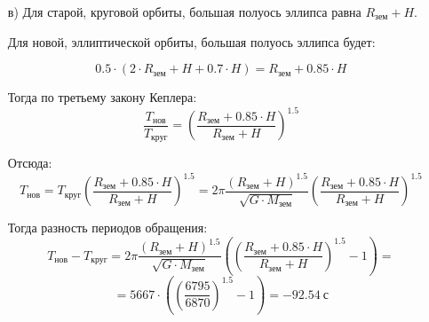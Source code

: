 \begin{enumerate}
    \item[в)] Для старой, круговой орбиты, большая полуось эллипса равна $R_\text{зем} + H$. 
    
    Для новой, эллиптической орбиты, большая полуось эллипса будет: 
    
    $$0.5 \cdot (2 \cdot R_\text{зем}+H+0.7 \cdot H)=R_\text{зем}+0.85 \cdot H$$
    
    Тогда по третьему закону Кеплера:
    $$\frac{T_\text{нов}}{T_\text{круг}} = \left( \frac{R_\text{зем} + 0.85 \cdot H}{R_\text{зем}+H} \right)^{1.5}$$
    
    Отсюда: 
    $$T_\text{нов} = T_\text{круг} \left( \frac{R_\text{зем} + 0.85 \cdot H}{R_\text{зем}+H} \right)^{1.5} = 2 \pi \frac{(R_\text{зем} + H)^{1.5}}{\sqrt{G \cdot M_\text{зем}}} \left( \frac{R_\text{зем} + 0.85 \cdot H}{R_\text{зем} + H} \right)^{1.5}$$
    
    Тогда разность периодов обращения:
    $$T_\text{нов}-T_\text{круг}=2 \pi \frac{(R_\text{зем}+H)^{1.5}}{\sqrt{G \cdot M_\text{зем}}} \left( \left( \frac{R_\text{зем}+0.85\cdot H}{R_\text{зем}+H} \right)^{1.5}-1\right)=$$
    $$=5667 \cdot \left( \left(\frac{6795}{6870}\right)^{1.5}-1\right)=-92.54 \: \text{с}$$
    
\end{enumerate}

